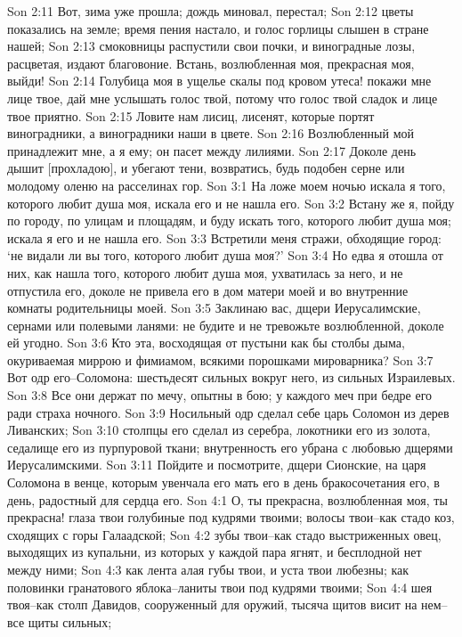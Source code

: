 Son 2:11  Вот, зима уже прошла; дождь миновал, перестал;
Son 2:12  цветы показались на земле; время пения настало, и голос горлицы слышен в стране нашей;
Son 2:13  смоковницы распустили свои почки, и виноградные лозы, расцветая, издают благовоние. Встань, возлюбленная моя, прекрасная моя, выйди!
Son 2:14  Голубица моя в ущелье скалы под кровом утеса! покажи мне лице твое, дай мне услышать голос твой, потому что голос твой сладок и лице твое приятно.
Son 2:15  Ловите нам лисиц, лисенят, которые портят виноградники, а виноградники наши в цвете.
Son 2:16  Возлюбленный мой принадлежит мне, а я ему; он пасет между лилиями.
Son 2:17  Доколе день дышит [прохладою], и убегают тени, возвратись, будь подобен серне или молодому оленю на расселинах гор.
Son 3:1  На ложе моем ночью искала я того, которого любит душа моя, искала его и не нашла его.
Son 3:2  Встану же я, пойду по городу, по улицам и площадям, и буду искать того, которого любит душа моя; искала я его и не нашла его.
Son 3:3  Встретили меня стражи, обходящие город: `не видали ли вы того, которого любит душа моя?'
Son 3:4  Но едва я отошла от них, как нашла того, которого любит душа моя, ухватилась за него, и не отпустила его, доколе не привела его в дом матери моей и во внутренние комнаты родительницы моей.
Son 3:5  Заклинаю вас, дщери Иерусалимские, сернами или полевыми ланями: не будите и не тревожьте возлюбленной, доколе ей угодно.
Son 3:6  Кто эта, восходящая от пустыни как бы столбы дыма, окуриваемая миррою и фимиамом, всякими порошками мироварника?
Son 3:7  Вот одр его--Соломона: шестьдесят сильных вокруг него, из сильных Израилевых.
Son 3:8  Все они держат по мечу, опытны в бою; у каждого меч при бедре его ради страха ночного.
Son 3:9  Носильный одр сделал себе царь Соломон из дерев Ливанских;
Son 3:10  столпцы его сделал из серебра, локотники его из золота, седалище его из пурпуровой ткани; внутренность его убрана с любовью дщерями Иерусалимскими.
Son 3:11  Пойдите и посмотрите, дщери Сионские, на царя Соломона в венце, которым увенчала его мать его в день бракосочетания его, в день, радостный для сердца его.
Son 4:1  О, ты прекрасна, возлюбленная моя, ты прекрасна! глаза твои голубиные под кудрями твоими; волосы твои--как стадо коз, сходящих с горы Галаадской;
Son 4:2  зубы твои--как стадо выстриженных овец, выходящих из купальни, из которых у каждой пара ягнят, и бесплодной нет между ними;
Son 4:3  как лента алая губы твои, и уста твои любезны; как половинки гранатового яблока--ланиты твои под кудрями твоими;
Son 4:4  шея твоя--как столп Давидов, сооруженный для оружий, тысяча щитов висит на нем--все щиты сильных;
